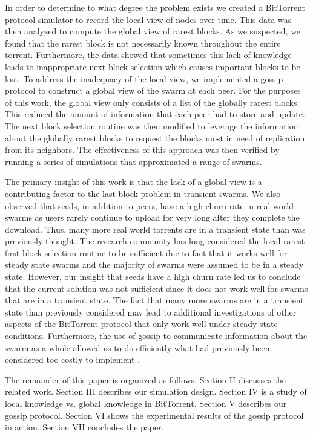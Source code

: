 In order to determine to what degree the problem exists we created a BitTorrent
protocol simulator to record the local view of nodes over time. This data was then
analyzed to compute the global view of rarest blocks. As we suspected,
we found that the rarest block is not necessarily known throughout the
entire torrent. Furthermore, the data showed that sometimes this lack
of knowledge leads to inappropriate next block selection which causes
important blocks to be lost. To address the inadequacy of the local view,
we implemented a gossip protocol to construct a global view of
the swarm at each peer. For the purposes of this work, the global view
only consists of a list of the globally rarest blocks. This reduced the
amount of information that each peer had to store and update. The next block
selection routine was then modified to leverage the information
about the globally rarest blocks to request the blocks most in need
of replication from its neighbors. The effectiveness of this approach
was then verified by running a series of simulations that
approximated a range of swarms.


The primary insight of this work is that the lack of a global view
is a contributing factor to the last block problem in transient
swarms. We also observed that seeds, in addition to peers, have a high
churn rate in real world swarms as users rarely continue to upload for
very long after they complete the download. Thus, many more real world
torrents are in a transient state than was previously thought. The
research community has long considered the local rarest first block
selection routine to be sufficient due to fact that it works well for
steady state swarms and the majority of swarms were assumed to be in
a steady state. However, our insight that seeds have a high churn rate
led us to conclude that the current solution was not sufficient since
it does not work well for swarms that are in a transient state. The fact
that many more swarms are in a transient state than previously considered
may lead to additional investigations of other aspects of the BitTorrent
protocol that only work well under steady state conditions. Furthermore,
the use of gossip to communicate information about the swarm as a whole
allowed us to do efficiently what had previously been considered too
costly to implement \cite{cohen:1}.


The remainder of this paper is organized as follows. Section II discusses
the related work. Section III describes our simulation design.
Section IV is a study of local knowledge vs. global knowledge in BitTorrent.
Section V describes our gossip protocol. Section VI
shows the experimental results of the gossip protocol in action. Section VII
concludes the paper.
